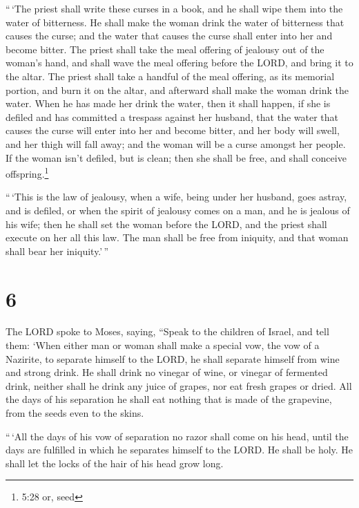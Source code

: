  ``\,`The priest shall write these curses in a book, and he
shall wipe them into the water of bitterness.  He shall
make the woman drink the water of bitterness that causes the curse; and
the water that causes the curse shall enter into her and become bitter.
 The priest shall take the meal offering of jealousy out of
the woman's hand, and shall wave the meal offering before the LORD, and
bring it to the altar.  The priest shall take a handful of
the meal offering, as its memorial portion, and burn it on the altar,
and afterward shall make the woman drink the water.  When
he has made her drink the water, then it shall happen, if she is defiled
and has committed a trespass against her husband, that the water that
causes the curse will enter into her and become bitter, and her body
will swell, and her thigh will fall away; and the woman will be a curse
amongst her people.  If the woman isn't defiled, but is
clean; then she shall be free, and shall conceive offspring.\footnote{5:28
  or, seed}

 ``\,`This is the law of jealousy, when a wife, being under
her husband, goes astray, and is defiled,  or when the
spirit of jealousy comes on a man, and he is jealous of his wife; then
he shall set the woman before the LORD, and the priest shall execute on
her all this law.  The man shall be free from iniquity, and
that woman shall bear her iniquity.'\,''

\hypertarget{section-5}{%
\section{6}\label{section-5}}

 The LORD spoke to Moses, saying,  ``Speak to
the children of Israel, and tell them: `When either man or woman shall
make a special vow, the vow of a Nazirite, to separate himself to the
LORD,  he shall separate himself from wine and strong drink.
He shall drink no vinegar of wine, or vinegar of fermented drink,
neither shall he drink any juice of grapes, nor eat fresh grapes or
dried.  All the days of his separation he shall eat nothing
that is made of the grapevine, from the seeds even to the skins.

 ``\,`All the days of his vow of separation no razor shall
come on his head, until the days are fulfilled in which he separates
himself to the LORD. He shall be holy. He shall let the locks of the
hair of his head grow long.

